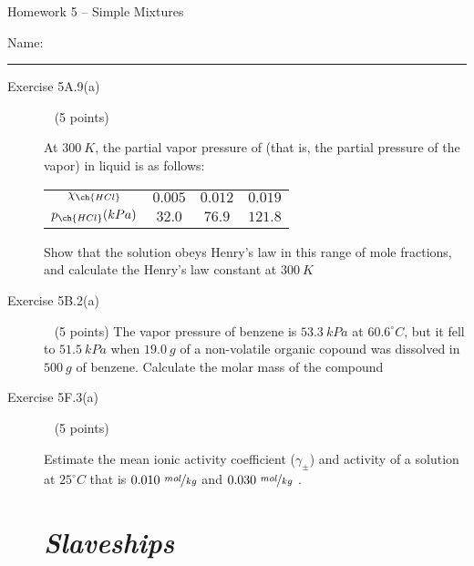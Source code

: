 \documentclass[12pt, openany, letterpaper]{memoir}
\begin{document}
\begin{center}
	{\large Homework 5 -- Simple Mixtures}
	
\end{center}

Name: \rule[-.1mm]{15em}{0.1pt}

\begin{description}	
	\item [Exercise 5A.9(a)] ~ (5 points)
	
	At $300~K$, the partial vapor pressure of  (that is, the partial pressure of the  vapor) in liquid  is as follows:
	
	\begin{tabular}{c|c|c|c}
		$\chi_{\ch{HCl}}$	& 	$0.005$	&	$0.012$	&	$0.019$\\
		$p_{\ch{HCl}}(kPa)$	&	$32.0$	&	$76.9$	&	$121.8$
	\end{tabular}

	Show that the solution obeys Henry's law in this range of mole fractions, and calculate the Henry's law constant at $300~K$
	
	\vspace{15em}
	\item [Exercise 5B.2(a)] ~ (5 points)
	The vapor pressure of benzene is $53.3~kPa$ at $60.6^\circ C$, but it fell to $51.5~kPa$ when $19.0~g$ of a non-volatile organic copound was dissolved in $500~g$ of benzene. Calculate the molar mass of the compound

	
	\vspace{20em}


	
	\item [Exercise 5F.3(a)] ~ (5 points)
	
	Estimate the mean ionic activity coefficient ($\gamma_\pm$) and activity of a solution at $25^\circ C$ that is $0.010~\nicefrac{mol}{kg}$  and $0.030~\nicefrac{mol}{kg}$ .
	
	\vspace{18em}

	
\newpage
\pagestyle{empty}
\addtocounter{page}{-1}	
\section*{\emph{Slaveships}}

\end{description}
\end{document}
